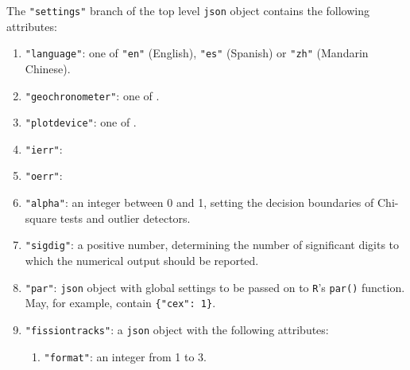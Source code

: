 \begin{refsection}
\noindent The \texttt{"settings"} branch of the top level
\texttt{json} object contains the following attributes:

\begin{enumerate}[leftmargin=\parindent,align=left,
      labelwidth=\parindent,label*=2.\arabic*.]
\item{\tt "language"}: one of \texttt{"en"} (English), \texttt{"es"}
  (Spanish) or \texttt{"zh"} (Mandarin Chinese).
\item{\tt "geochronometer"}: one of .
\item{\tt "plotdevice"}: one of .
\item{\tt "ierr"}: 
\item{\tt "oerr"}: 
\item{\tt "alpha"}: an integer between 0 and 1, setting the decision
  boundaries of Chi-square tests and outlier detectors.
\item{\tt "sigdig"}: a positive number, determining the number of
  significant digits to which the numerical output should be reported.
\item{\tt "par"}: \texttt{json} object with global settings to be
  passed on to \texttt{R}'s \texttt{par()} function. May, for example,
  contain \texttt{\{"cex": 1\}}.
\item{\tt "fissiontracks"}: a \texttt{json} object with the following
  attributes:
  \begin{enumerate}[leftmargin=\parindent,align=left,labelwidth=\parindent,label*=\arabic*.]
  \item{\tt "format"}: an integer from 1 to 3.

\end{enumerate}
\end{enumerate}
\end{refsection}

